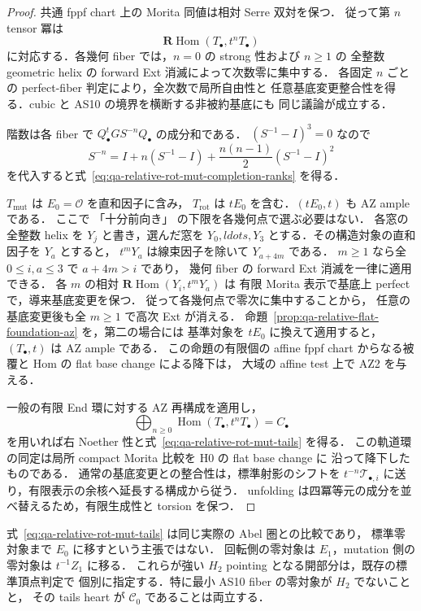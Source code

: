 \begin{proof}
共通 fppf chart 上の Morita 同値は相対 Serre 双対を保つ．
従って第 $n$ tensor 冪は
\[
 \mathbf R\operatorname{Hom}(T_\bullet,t^nT_\bullet)
\]
に対応する．各幾何 fiber では，$n=0$ の strong 性および $n\geq1$ の
全整数 geometric helix の forward Ext 消滅によって次数零に集中する．
各固定 $n$ ごとの perfect-fiber 判定により，全次数で局所自由性と
任意基底変更整合性を得る．cubic と AS10 の境界を横断する非被約基底にも
同じ議論が成立する．

階数は各 fiber で $Q_\bullet^tGS^{-n}Q_\bullet$ の成分和である．
$(S^{-1}-I)^3=0$ なので
\[
 S^{-n}=I+n(S^{-1}-I)+\frac{n(n-1)}2(S^{-1}-I)^2
\]
を代入すると式~\eqref{eq:qa-relative-rot-mut-completion-ranks} を得る．

$T_{\mathrm{mut}}$ は $E_0=\mathcal O$ を直和因子に含み，
$T_{\mathrm{rot}}$ は $tE_0$ を含む．$(tE_0,t)$ も AZ ample である．
ここで 「十分前向き」 の下限を各幾何点で選ぶ必要はない．
各窓の全整数 helix を $Y_j$ と書き，選んだ窓を $Y_0,ldots,Y_3$
とする．その構造対象の直和因子を $Y_a$ とすると，
$t^mY_a$ は線束因子を除いて $Y_{a+4m}$ である．
$m\geq1$ なら全 $0\leq i,a\leq3$ で $a+4m>i$ であり，
幾何 fiber の forward Ext 消滅を一律に適用できる．
各 $m$ の相対 $\mathbf R\operatorname{Hom}(Y_i,t^mY_a)$ は
有限 Morita 表示で基底上 perfect で，導来基底変更を保つ．
従って各幾何点で零次に集中することから，
任意の基底変更後も全 $m\geq1$ で高次 Ext が消える．
命題~\ref{prop:qa-relative-flat-foundation-az} を，第二の場合には
基準対象を $tE_0$ に換えて適用すると，$(T_\bullet,t)$ は AZ ample である．
この命題の有限個の affine fppf chart からなる被覆と Hom の flat base change による降下は，
大域の affine test 上で AZ2 を与える．

一般の有限 End 環に対する AZ 再構成を適用し，
\[
 \bigoplus_{n\geq0}\operatorname{Hom}(T_\bullet,t^nT_\bullet)
       =C_\bullet
\]
を用いれば右 Noether 性と式~\eqref{eq:qa-relative-rot-mut-tails} を得る．
この軌道環の同定は局所 compact Morita 比較を H0 の flat base change に
沿って降下したものである．
通常の基底変更との整合性は，標準射影のシフトを
$t^{-n}\mathcal T_{\bullet,i}$ に送り，有限表示の余核へ延長する構成から従う．
unfolding は四冪等元の成分を並べ替えるため，有限生成性と torsion を保つ．
\end{proof}

\begin{remark}[構造対象の指定]
式~\eqref{eq:qa-relative-rot-mut-tails} は同じ実際の Abel 圏との比較であり，
標準零対象まで $E_0$ に移すという主張ではない．
回転側の零対象は $E_1$，mutation 側の零対象は $t^{-1}Z_1$ に移る．
これらが強い $H_2$ pointing となる開部分は，既存の標準頂点判定で
個別に指定する．特に最小 AS10 fiber の零対象が $H_2$ でないことと，
その tails heart が $\mathcal C_0$ であることは両立する．
\end{remark}


